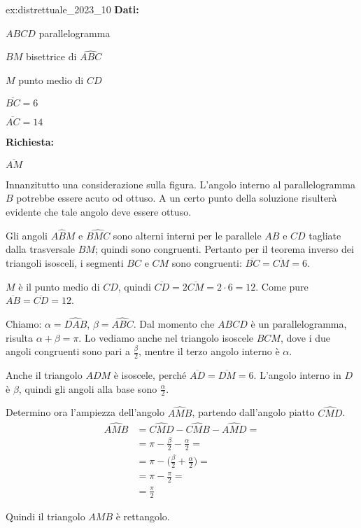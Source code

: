 \begin{soluzione}{ex:distrettuale_2023_10}
    \textbf{Dati:}

    $ABCD$ parallelogramma

    $BM$ bisettrice di $\hat{ABC}$

    $M$ punto medio di $CD$

    $\overline{BC} = 6$

    $\overline{AC} = 14$

    \textbf{Richiesta:}

    $\overline{AM}$

    \bigskip
    Innanzitutto una considerazione sulla figura.
    L'angolo interno al parallelogramma $B$ potrebbe essere acuto od ottuso.
    A un certo punto della soluzione risulterà evidente che tale angolo deve essere ottuso.

    Gli angoli $A\hat{B}M$ e $\hat{BMC}$ sono alterni interni per le parallele $AB$ e $CD$ tagliate dalla
    trasversale $BM$;
    quindi sono congruenti.
    Pertanto per il teorema inverso dei triangoli isosceli, i segmenti $BC$ e $CM$ sono congruenti:
    $\overline{BC} = \overline{CM} = 6$.

    $M$ è il punto medio di $CD$, quindi $\overline{CD} = 2 \overline{CM} = 2 \cdot 6 = 12$.
    Come pure $\overline{AB} = \overline{CD} = 12$.

    Chiamo: $\alpha = \hat{DAB}$, $\beta = \hat{ABC}$.
    Dal momento che $ABCD$ è un parallelogramma, risulta $\alpha + \beta = \pi$.
    Lo vediamo anche nel triangolo isoscele $BCM$, dove i due angoli congruenti sono pari a $\frac{\beta}{2}$, mentre
    il terzo angolo interno è $\alpha$.

    Anche il triangolo $ADM$ è isoscele, perché $\overline{AD} = \overline{DM} = 6$.
    L'angolo interno in $D$ è $\beta$, quindi gli angoli alla base sono $\frac{\alpha}{2}$.

    Determino ora l'ampiezza dell'angolo $\hat{AMB}$, partendo dall'angolo piatto $\hat{CMD}$.
    \begin{align*}
        \hat{AMB} &= \hat{CMD} - \hat{CMB} - \hat{AMD} = \\
        &= \pi - \frac{\beta}{2} - \frac{\alpha}{2} = \\
        &= \pi - \biggl(\frac{\beta}{2} + \frac{\alpha}{2} \biggr) = \\
        &= \pi - \frac{\pi}{2} = \\
        &= \frac{\pi}{2}
    \end{align*}

    Quindi il triangolo $AMB$ è rettangolo.


\end{soluzione}
